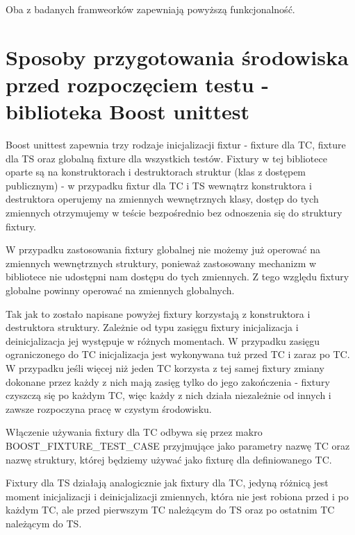\documentclass[12pt,a4paper,notitlepage]{report}
\begin{document}
Oba z badanych framweorków zapewniają powyższą funkcjonalność.

\section{Sposoby przygotowania środowiska przed rozpoczęciem testu - biblioteka Boost unittest}

Boost unittest zapewnia trzy rodzaje inicjalizacji fixtur - fixture dla TC, fixture dla TS oraz globalną fixture dla wszystkich testów. Fixtury w tej bibliotece oparte są na konstruktorach i destruktorach struktur (klas z dostępem publicznym) - w przypadku fixtur dla TC i TS wewnątrz konstruktora i destruktora operujemy na zmiennych wewnętrznych klasy, dostęp do tych zmiennych otrzymujemy w teście bezpośrednio bez odnoszenia się do struktury fixtury.

W przypadku zastosowania fixtury globalnej nie możemy już operować na zmiennych wewnętrznych struktury, ponieważ zastosowany mechanizm w bibliotece nie udostępni nam dostępu do tych zmiennych. Z tego względu fixtury globalne powinny operować na zmiennych globalnych.

Tak jak to zostało napisane powyżej fixtury korzystają z konstruktora i destruktora struktury. Zależnie od typu zasięgu fixtury inicjalizacja i deinicjalizacja jej występuje w różnych momentach. W przypadku zasięgu ograniczonego do TC inicjalizacja jest wykonywana tuż przed TC i zaraz po TC. W przypadku jeśli więcej niż jeden TC korzysta z tej samej fixtury zmiany dokonane przez każdy z nich mają zasięg tylko do jego zakończenia - fixtury czyszczą się po każdym TC, więc każdy z nich działa niezależnie od innych i zawsze rozpoczyna pracę w czystym środowisku.

Włączenie używania fixtury dla TC odbywa się przez makro BOOST{\_}FIXTURE{\_}TEST{\_}CASE przyjmujące jako parametry nazwę TC oraz nazwę struktury, której będziemy używać jako fixturę dla definiowanego TC.

			

Fixtury dla TS działają analogicznie jak fixtury dla TC, jedyną różnicą jest moment inicjalizacji i deinicjalizacji zmiennych, która nie jest robiona przed i po każdym TC, ale przed pierwszym TC należącym do TS oraz po ostatnim TC należącym do TS.
\end{document}

